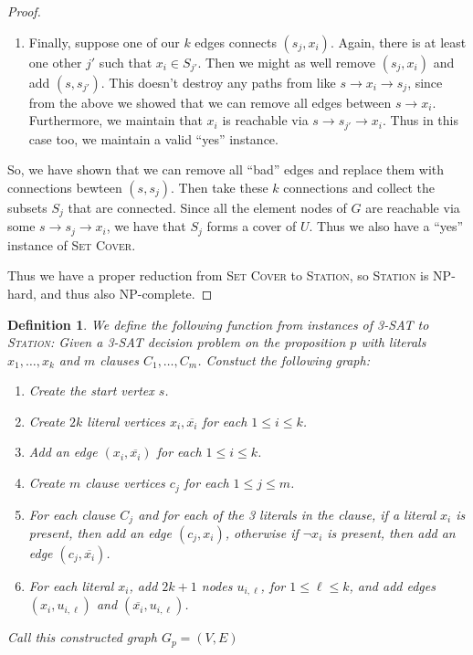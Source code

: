 \documentclass[10pt]{article}
\newtheorem{definition}{Definition}
\begin{document}
\begin{proof}
\begin{enumerate}
    \item Finally, suppose one of our \(k\) edges connects \((s_j, x_i)\). Again, there is at least one other \(j'\) such that \(x_i \in S_{j'}\). Then we might as well remove \((s_j, x_i)\) and add \((s, s_{j'})\). This doesn't destroy any paths from like \(s \to x_i \to s_j\), since from the above we showed that we can remove all edges between \(s \to x_i\). Furthermore, we maintain that \(x_i\) is reachable via \(s \to s_{j'} \to x_i\). Thus in this case too, we maintain a valid ``yes'' instance.
  \end{enumerate}

  So, we have shown that we can remove all ``bad'' edges and replace them with connections bewteen \((s, s_j)\). Then take these \(k\) connections and collect the subsets \(S_j\) that are connected. Since all the element nodes of \(G\) are reachable via some \(s \to s_j \to x_i\), we have that \(S_j\) forms a cover of \(U\). Thus we also have a ``yes'' instance of \textsc{Set Cover}. 
  
  Thus we have a proper reduction from \textsc{Set Cover} to \textsc{Station}, so \textsc{Station} is NP-hard, and thus also NP-complete.
\end{proof}

\begin{definition}
  We define the following function from instances of \textsc{3-SAT} to \textsc{Station}: Given a \textsc{3-SAT} decision problem on the proposition \(p\) with literals \(x_1, \ldots, x_k\) and \(m\) clauses \(C_1, \ldots, C_m\). Constuct the following graph: 
  \begin{enumerate}
    \item Create the start vertex \(s\).
    \item Create \(2k\) literal vertices \(x_i, \overline{x_i}\) for each \(1 \leq i \leq k\). 
    \item Add an edge \((x_i, \overline{x_i})\) for each \(1 \leq i \leq k\).
    \item Create \(m\) clause vertices \(c_j\) for each \(1 \leq j \leq m\).
    \item For each clause \(C_j\) and for each of the 3 literals in the clause, if a literal \(x_i\) is present, then add an edge \((c_j, x_i)\), otherwise if \(\neg x_i\) is present, then add an edge \((c_j, \overline{x_i})\). 
    \item For each literal \(x_i\), add \(2k + 1\) nodes \(u_{i, \ell}\), for \(1 \leq \ell \leq k\), and add edges \((x_i, u_{i, \ell})\) and \((\overline{x_i}, u_{i, \ell})\).
  \end{enumerate}
  Call this constructed graph \(G_p = (V, E)\)
\end{definition}
\end{document}

